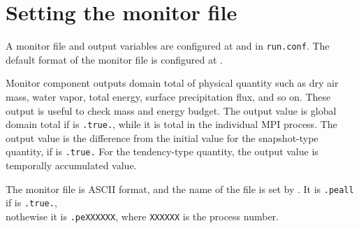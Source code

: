 \section{Setting the monitor file} \label{sec:monitor}

A monitor file and output variables are configured at  and  in \verb|run.conf|.
The default format of the monitor file is configured at .

%

Monitor component outputs domain total of physical quantity such as dry air mass, water vapor, total energy, surface precipitation flux, and so on.
These output is useful to check mass and energy budget.
The output value is global domain total if  is \verb|.true.|, while it is total in the individual MPI process.
The output value is the difference from the initial value for the snapshot-type quantity, if  is \verb|.true.|
For the tendency-type quantity, the output value is temporally accumulated value.

The monitor file is ASCII format, and the name of the file is set by .
It is \verb|.peall| if  is \verb|.true.|,\\
nothewise it is \verb|.peXXXXXX|, where \verb|XXXXXX| is the process number.

